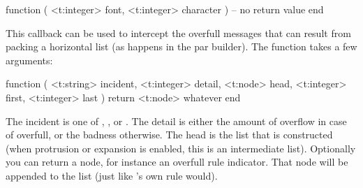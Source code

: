 \starttyping[option=LUA]
function (
    <t:integer> font,
    <t:integer> character
)
    -- no return value
end
\stoptyping

\stopsubsection

\startsubsection[title=tail_append]





\stopsubsection

\stopsection

\startsection[title=Tracing]

\startsubsection[title=hpack_quality]

This callback can be used to intercept the overfull messages that can result from
packing a horizontal list (as happens in the par builder). The function takes a
few arguments:

\starttyping[option=LUA]
function (
    <t:string>  incident,
    <t:integer> detail,
    <t:node>    head,
    <t:integer> first,
    <t:integer> last
 )
    return <t:node> whatever
end
\stoptyping

The incident is one of , ,  or
. The detail is either the amount of overflow in case of \type
{overfull}, or the badness otherwise. The head is the list that is constructed
(when protrusion or expansion is enabled, this is an intermediate list).
Optionally you can return a node, for instance an overfull rule indicator. That
node will be appended to the list (just like \TEX's own rule would).

\stopsubsection

\startsubsection[title=vpack_quality]

